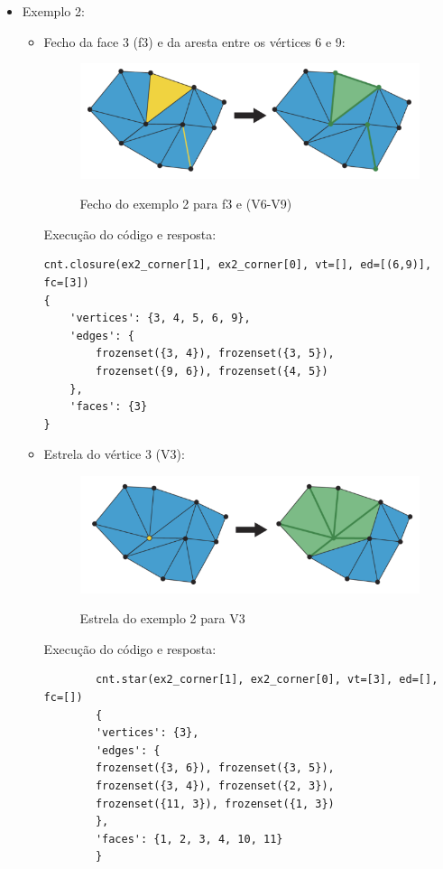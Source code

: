 \documentclass[a4paper]{article}
\begin{document}
\begin{itemize}
	\item Exemplo 2:
	\begin{itemize}
		\item Fecho da face 3 (f3) e da aresta entre os vértices 6 e 9:
		 \begin{figure}[ht]
			\centering
			\includegraphics[width=1.0\textwidth]{fecho_ex2.png}
			\label{fig:fecho_ex2}
			\caption[caption]{Fecho do exemplo 2 para f3 e (V6-V9)}
		\end{figure}
		
		Execução do código e resposta:
		\begin{verbatim}
cnt.closure(ex2_corner[1], ex2_corner[0], vt=[], ed=[(6,9)], fc=[3])
{ 
	'vertices': {3, 4, 5, 6, 9}, 
	'edges': {
		frozenset({3, 4}), frozenset({3, 5}), 
		frozenset({9, 6}), frozenset({4, 5})
	}, 
	'faces': {3}
}
		\end{verbatim}
		
		\item Estrela do vértice 3 (V3):
		\begin{figure}[ht]
			\centering
			\includegraphics[width=1.0\textwidth]{estrela_ex2.png}
			\label{fig:estrela_ex2}
			\caption[caption]{Estrela do exemplo 2 para V3}
		\end{figure}
		
		Execução do código e resposta:
		\begin{verbatim}
		cnt.star(ex2_corner[1], ex2_corner[0], vt=[3], ed=[], fc=[])
		{
		'vertices': {3}, 
		'edges': {
		frozenset({3, 6}), frozenset({3, 5}), 
		frozenset({3, 4}), frozenset({2, 3}), 
		frozenset({11, 3}), frozenset({1, 3})
		}, 
		'faces': {1, 2, 3, 4, 10, 11}
		}
		\end{verbatim}
		

\end{itemize}
\end{itemize}
\end{document}
